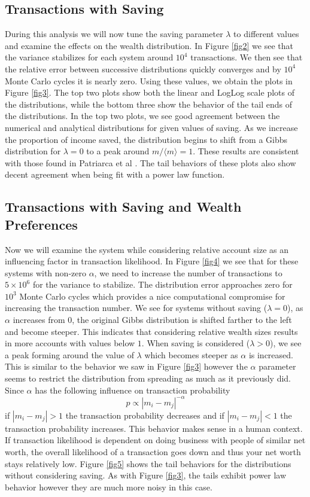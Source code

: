 \documentclass{emulateapj}
\begin{document}
\subsection{Transactions with Saving}
During this analysis we will now tune the saving parameter $\lambda$ to different values and examine the effects on the wealth distribution. In Figure \ref{fig2} we see that the variance stabilizes for each system around $10^4$ transactions. We then see that the relative error between successive distributions quickly converges and by $10^4$ Monte Carlo cycles it is nearly zero. Using these values, we obtain the plots in Figure \ref{fig3}. The top two plots show both the linear and LogLog scale plots of the distributions, while the bottom three show the behavior of the tail ends of the distributions. In the top two plots, we see good agreement between the numerical and analytical distributions for given values of saving. As we increase the proportion of income saved, the distribution begins to shift from a Gibbs distribution for $\lambda = 0$ to a peak around $m/\langle m \rangle = 1$. These results are consistent with those found in Patriarca et al \cite{paper1}. The tail behaviors of these plots also show decent agreement when being fit with a power law function.

\subsection{Transactions with Saving and Wealth Preferences}
Now we will examine the system while considering relative account size as an influencing factor in transaction likelihood. In Figure \ref{fig4} we see that for these systems with non-zero $\alpha$, we need to increase the number of transactions to $5\times10^6$ for the variance to stabilize. The distribution error approaches zero for $10^3$ Monte Carlo cycles which provides a nice computational compromise for increasing the transaction number. We see for systems without saving ($\lambda = 0$), as $\alpha$ increases from $0$, the original Gibbs distribution is shifted farther to the left and become steeper. This indicates that considering relative wealth sizes results in more accounts with values below $1$. When saving is considered ($\lambda > 0$), we see a peak forming around the value of $\lambda$ which becomes steeper as $\alpha$ is increased. This is similar to the behavior we saw in Figure \ref{fig3} however the $\alpha$ parameter seems to restrict the distribution from spreading as much as it previously did. Since $\alpha$ has the following influence on transaction probability
\begin{equation}
    p \propto |m_i - m_j|^{-\alpha}
\end{equation}
if $|m_i - m_j| > 1$ the transaction probability decreases and if $|m_i - m_j| < 1$ the transaction probability increases.
This behavior makes sense in a human context. If transaction likelihood is dependent on doing business with people of similar net worth, the overall likelihood of a transaction goes down and thus your net worth stays relatively low. Figure \ref{fig5} shows the tail behaviors for the distributions without considering saving. As with Figure \ref{fig3}, the tails exhibit power law behavior however they are much more noisy in this case.
\end{document}
